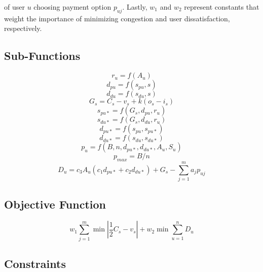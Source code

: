 \documentclass[times, 10pt,twocolumn]{article}
\begin{document}
of user $u$ choosing payment option $p_{uj}$. Lastly, $w_1$ and $w_2$ represent constants that weight the importance of minimizing congestion and user dissatisfaction, respectively.

\subsection{Sub-Functions}

\begin{equation}
r_u = f(A_u)
\end{equation}
\begin{equation}
d_{pu} = f(s_{pu}, s)
\end{equation}
\begin{equation}
d_{du} = f(s_{du}, s)
\end{equation}
\begin{equation}
G_s = C_s - v_s + k(o_s - i_s)
\end{equation}
\begin{equation}
s_{pu*} = f(G_s, d_{pu}, r_u)
\end{equation}
\begin{equation}
s_{du*} = f(G_s, d_{du}, r_u)
\end{equation}
\begin{equation}
d_{pu*} = f(s_{pu}, s_{pu*})
\end{equation}
\begin{equation}
d_{du*} = f(s_{du}, s_{du*})
\end{equation}
\begin{equation}
p_u = f(B, n, d_{pu*}, d_{du*}, A_u, S_u)
\end{equation}
\begin{equation}
p_{max} = B/n
\end{equation}
\begin{equation}
D_u = c_3A_u(c_1d_{pu*} + c_2d_{du*}) + G_s - \sum_{j=1}^{m}a_jp_{uj}
\end{equation}

\subsection{Objective Function}

\begin{equation}
w_1\sum_{j=1}^{m}\min{|\frac{1}{2}C_s - v_s|} + w_2\min{\sum_{u=1}^{n}D_u}
\end{equation}

\subsection{Constraints}
\end{document}

